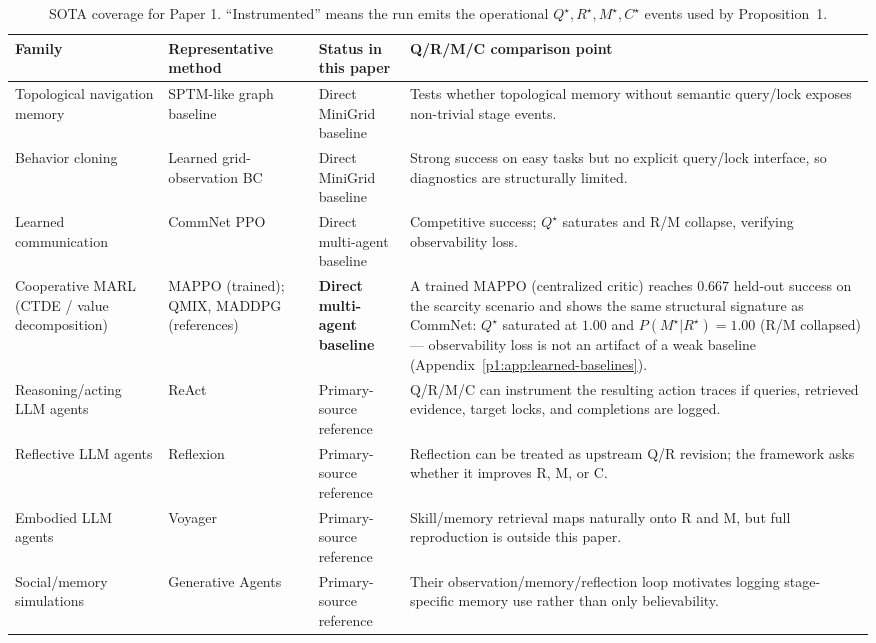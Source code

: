 \documentclass{article}
\begin{document}
\begin{table}[h]
\caption{SOTA coverage for Paper 1. ``Instrumented'' means the run emits the operational $Q^\star,R^\star,M^\star,C^\star$ events used by Proposition~1.}
\label{p1:tab:sota-coverage}
\centering
\small
\begin{tabular}{p{2.45cm}p{2.55cm}p{2.7cm}p{4.0cm}}
\toprule
Family & Representative method & Status in this paper & Q/R/M/C comparison point \\
\midrule
Topological navigation memory & SPTM-like graph baseline \citep{savinov2018semi} & Direct MiniGrid baseline & Tests whether topological memory without semantic query/lock exposes non-trivial stage events. \\
Behavior cloning & Learned grid-observation BC & Direct MiniGrid baseline & Strong success on easy tasks but no explicit query/lock interface, so diagnostics are structurally limited. \\
Learned communication & CommNet PPO \citep{sukhbaatar2016commnet,schulman2017proximal} & Direct multi-agent baseline & Competitive success; $Q^\star$ saturates and R/M collapse, verifying observability loss. \\
Cooperative MARL (CTDE / value decomposition) & MAPPO \citep{yu2022mappo} (trained); QMIX, MADDPG \citep{rashid2018qmix,lowe2017maddpg} (references) & \textbf{Direct multi-agent baseline} & A trained MAPPO (centralized critic) reaches $0.667$ held-out success on the scarcity scenario and shows the same structural signature as CommNet: $Q^\star$ saturated at $1.00$ and $P(M^\star|R^\star){=}1.00$ (R/M collapsed) --- observability loss is not an artifact of a weak baseline (Appendix~\ref{p1:app:learned-baselines}). \\
Reasoning/acting LLM agents & ReAct \citep{yao2022react} & Primary-source reference & Q/R/M/C can instrument the resulting action traces if queries, retrieved evidence, target locks, and completions are logged. \\
Reflective LLM agents & Reflexion \citep{shinn2023reflexion} & Primary-source reference & Reflection can be treated as upstream Q/R revision; the framework asks whether it improves R, M, or C. \\
Embodied LLM agents & Voyager \citep{wang2023voyager} & Primary-source reference & Skill/memory retrieval maps naturally onto R and M, but full reproduction is outside this paper. \\
Social/memory simulations & Generative Agents \citep{park2023generative} & Primary-source reference & Their observation/memory/reflection loop motivates logging stage-specific memory use rather than only believability. \\

\end{tabular}
\end{table}
\end{document}
